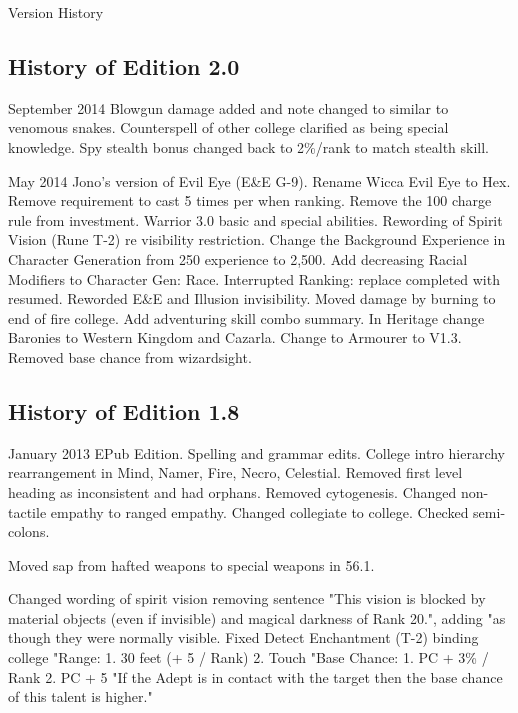 \begin{Chapter}{Version History}

\subsection{History of Edition 2.0}

\begin{Description}

\item[September 2014] Blowgun damage added and note changed to similar
  to venomous snakes.  Counterspell of other college clarified as
  being special knowledge.  Spy stealth bonus changed back to 2\%/rank
  to match stealth skill.

\item[May 2014] Jono's version of Evil Eye (E\&E G-9).  Rename Wicca
  Evil Eye to Hex.  Remove requirement to cast 5 times per when
  ranking.  Remove the 100 charge rule from investment.  Warrior 3.0
  basic and special abilities.  Rewording of Spirit Vision (Rune T-2)
  re visibility restriction.  Change the Background Experience in
  Character Generation from 250 experience to 2,500.  Add decreasing
  Racial Modifiers to Character Gen: Race.  Interrupted Ranking:
  replace completed with resumed.  Reworded E\&E and Illusion
  invisibility.  Moved damage by burning to end of fire college.  Add
  adventuring skill combo summary.  In Heritage change Baronies to
  Western Kingdom and Cazarla.  Change to Armourer to V1.3.  Removed
  base chance from wizardsight.

\end{Description}

\subsection{History of Edition 1.8}

\begin{Description}

\item[January 2013] EPub Edition. Spelling and grammar edits.  College
  intro hierarchy rearrangement in Mind, Namer, Fire, Necro,
  Celestial. Removed first level heading as inconsistent and had
  orphans.  Removed cytogenesis.  Changed non-tactile empathy to
  ranged empathy.  Changed collegiate to college. Checked semi-colons.

Moved  sap  from  hafted  weapons  to  special  weapons in 56.1. 

Changed wording of spirit vision removing sentence "This vision is
blocked by material objects (even if invisible) and magical darkness
of Rank 20.", adding "as though they were normally visible.  Fixed
Detect Enchantment (T-2) binding college "Range: 1.  30 feet (+ 5 /
Rank) 2.  Touch "Base Chance: 1. PC + 3\% / Rank 2. PC + 5%
"If the Adept is in contact with the target then the base chance of
this talent is higher."


\end{Description}
\end{Chapter}
